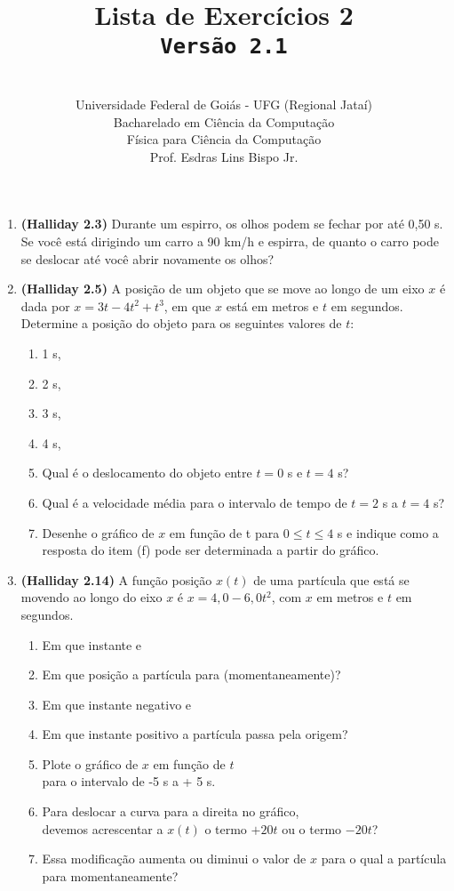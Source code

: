 \documentclass[12pt,a4paper,oneside]{article}
\author{\\Universidade Federal de Goiás - UFG (Regional Jataí) \\Bacharelado em Ciência da Computação \\Física para Ciência da Computação \\Prof. Esdras Lins Bispo Jr.}
\title{
	{\sc \huge Lista de Exercícios 2} 
	\\{\tt Versão 2.1}
}
\begin{document}
\maketitle

\begin{enumerate}

\section{Conceitos}
	
	\item {\bf (Halliday 2.3)} Durante um espirro, os olhos podem se fechar por até 0,50 s. Se você está dirigindo um carro a 90 km/h e espirra, de quanto o carro pode se deslocar até você abrir novamente os olhos?
	
	\item {\bf (Halliday 2.5)} A posição de um objeto que se move ao longo de um eixo $x$ é dada por $x = 3t - 4t^2 + t^3$, em que $x$ está em metros e $t$ em segundos. Determine a posição do objeto para os seguintes valores de $t$: 
		\begin{enumerate}
			\item 1 s,
			\item 2 s,
			\item 3 s,
			\item 4 s,
			\item Qual é o deslocamento do objeto entre $t = 0$ s e $t = 4$ s?
			\item Qual é a velocidade média para o intervalo de tempo de $t = 2$ s a $t = 4$ s?
			\item Desenhe o gráfico de $x$ em função de t para $0 \leq t \leq 4$ s e indique como a resposta do item (f) pode ser
			determinada a partir do gráfico.
		\end{enumerate}
	
	\item {\bf (Halliday 2.14)} A função posição $x(t)$ de uma partícula que está se movendo ao longo do eixo $x$ é $x = 4,0 - 6,0t^2$, com $x$ em metros e $t$ em segundos. \label{q:2-14}
	\begin{enumerate}
		\item Em que instante e
		\item Em que posição a partícula para (momentaneamente)?
		\item Em que instante negativo e
		\item Em que instante positivo a partícula passa pela origem?
		\item Plote o gráfico de $x$ em função de $t$ \\
		para o intervalo de -5 s a + 5 s.
		\item Para deslocar a curva para a direita no gráfico,\\ devemos acrescentar a $x(t)$ o termo $+20t$ ou o termo $-20t$?
		\item Essa modificação aumenta ou diminui o valor de $x$ para o qual a partícula para momentaneamente?
	\end{enumerate}


\end{enumerate}
\end{document}
